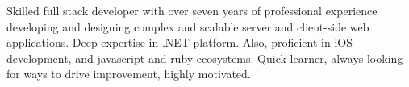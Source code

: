 

\begin{cvparagraph}

Skilled full stack developer with over seven years of professional experience developing and designing complex and scalable server and client-side web applications. Deep expertise in .NET platform. Also, proficient in iOS development, and javascript and ruby ecosystems. Quick learner, always looking for ways to drive improvement, highly motivated.
\end{cvparagraph}
